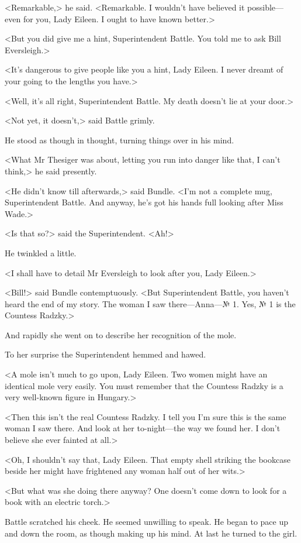 <Remarkable,> he said. <Remarkable. I wouldn't have believed it possible—even for you, Lady Eileen. I ought to have known better.>

<But you did give me a hint, Superintendent Battle. You told me to ask Bill Eversleigh.>

<It's dangerous to give people like you a hint, Lady Eileen. I never dreamt of your going to the lengths you have.>

<Well, it's all right, Superintendent Battle. My death doesn't lie at your door.>

<Not yet, it doesn't,> said Battle grimly.

He stood as though in thought, turning things over in his mind.

<What Mr Thesiger was about, letting you run into danger like that, I can't think,> he said presently.

<He didn't know till afterwards,> said Bundle. <I'm not a complete mug, Superintendent Battle. And anyway, he's got his hands full looking after Miss Wade.>

<Is that so?> said the Superintendent. <Ah!>

He twinkled a little.

<I shall have to detail Mr Eversleigh to look after you, Lady Eileen.>

<Bill!> said Bundle contemptuously. <But Superintendent Battle, you haven't heard the end of my story. The woman I saw there—Anna—№ 1. Yes, № 1 is the Countess Radzky.>

And rapidly she went on to describe her recognition of the mole.

To her surprise the Superintendent hemmed and hawed.

<A mole isn't much to go upon, Lady Eileen. Two women might have an identical mole very easily. You must remember that the Countess Radzky is a very well-known figure in Hungary.>

<Then this isn't the real Countess Radzky. I tell you I'm sure this is the same woman I saw there. And look at her to-night—the way we found her. I don't believe she ever fainted at all.>

<Oh, I shouldn't say that, Lady Eileen. That empty shell striking the bookcase beside her might have frightened any woman half out of her wits.>

<But what was she doing there anyway? One doesn't come down to look for a book with an electric torch.>

Battle scratched his cheek. He seemed unwilling to speak. He began to pace up and down the room, as though making up his mind. At last he turned to the girl.

